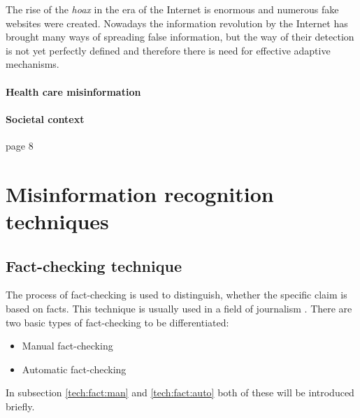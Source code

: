 \documentclass[11pt ,english,a4paper]{article}
\begin{document}
The rise of the \emph{hoax} in the era of the Internet is enormous and numerous fake websites were created.\cite{bur17history} Nowadays the information revolution by the Internet has brought many ways of spreading false information, but the way of their detection is not yet perfectly defined and therefore there is need for effective adaptive mechanisms.

\paragraph{Health care misinformation}%
\cite{wa19sys}\cite{cook15misinfo} \cite{chap22unmask}

\paragraph{Societal context}%
\cite{who22infodemics} page 8 \cite{wa19sys}


\section{Misinformation recognition techniques} \label{tech}

\subsection{Fact-checking technique} \label{tech:fact}
The process of fact-checking is used to distinguish, whether the specific claim is based on facts. This technique is usually used in a field of journalism \cite{alh18fact}.
There are two basic types of fact-checking to be differentiated:\cite{vla14fact} 
\begin{itemize}
\item Manual fact-checking
\item Automatic fact-checking
\end{itemize}
In subsection \ref{tech:fact:man} and \ref{tech:fact:auto} both of these will be introduced briefly.
\end{document}
